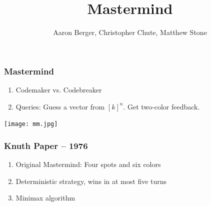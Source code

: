 \documentclass{beamer}
\title{Mastermind}
\author{Aaron Berger, Christopher Chute, Matthew Stone}
\begin{document}
    \begin{frame}
    	\maketitle
    \end{frame}

    \begin{frame}
    	\frametitle{Mastermind}
	   	\begin{enumerate}[label=\roman*.]
	    \item Codemaker vs. Codebreaker
	    \item Queries: Guess a vector from $[k]^n$. Get two-color feedback.
   	    \end{enumerate}
	    \begin{center}
	    \texttt{[image: mm.jpg]}
	    \end{center}
    \end{frame}

    \begin{frame}
    	\frametitle{Knuth Paper -- 1976}
    	\begin{enumerate}[label=\roman*.]
		\item Original Mastermind: Four spots and six colors
		\item Deterministic strategy, wins in at most five turns
		\item Minimax algorithm
		\end{enumerate}
    \end{frame}
    
    
\end{document}
